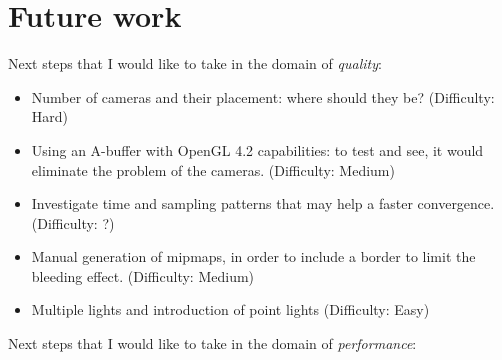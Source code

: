 \documentclass[12pt, twoside,a4paper]{article}
\begin{document}
\clearpage
\section{Future work}
Next steps that I would like to take in the domain of \textit{quality}:

\begin{itemize}
	\item Number of cameras and their placement: where should they be? (Difficulty: Hard)
	\item Using an A-buffer with OpenGL 4.2 capabilities: to test and see, it would eliminate the problem of the cameras. (Difficulty: Medium)
	\item Investigate time and sampling patterns that may help a faster convergence. (Difficulty: ?)
	\item Manual generation of mipmaps, in order to include a border to limit the bleeding effect. (Difficulty: Medium)
	\item Multiple lights and introduction of point lights (Difficulty: Easy)
\end{itemize}

Next steps that I would like to take in the domain of \textit{performance}:
\end{document}
